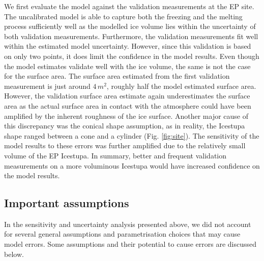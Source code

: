 \documentclass[utf8]{frontiersSCNS} %
\begin{document}
We first evaluate the model against the validation measurements at the EP site. The uncalibrated model is able to
capture both the freezing and the melting process sufficiently well as the modelled ice volume lies within the
uncertainty of both validation measurements. Furthermore, the validation measurements fit well within the estimated
model uncertainty.  However, since this validation is based on only two points, it does limit the confidence in the
model results. Even though the model estimates validate well with the ice volume, the same is not the case for the
surface area. The surface area estimated from the first validation measurement is just around $4\,m^2$, roughly half
the model estimated surface area. However, the validation surface area estimate again underestimates the surface area
as the actual surface area in contact with the atmosphere could have been amplified by the inherent roughness of the
ice surface. Another major cause of this discrepancy was the conical shape assumption, as in reality, the Icestupa
shape ranged between a cone and a cylinder (Fig.  \ref{fig:site}).   The sensitivity of the model results to these
errors was further amplified due to the relatively small volume of the EP Icestupa. In summary, better and frequent
validation measurements on a more voluminous Icestupa would have increased confidence on the model results.

\subsection{Important assumptions}\label{section:assumptions} In the sensitivity and uncertainty analysis presented
above, we did not account for several general assumptions and parametrisation choices that may cause model errors.
Some assumptions and their potential to cause errors are discussed below.
\end{document}
